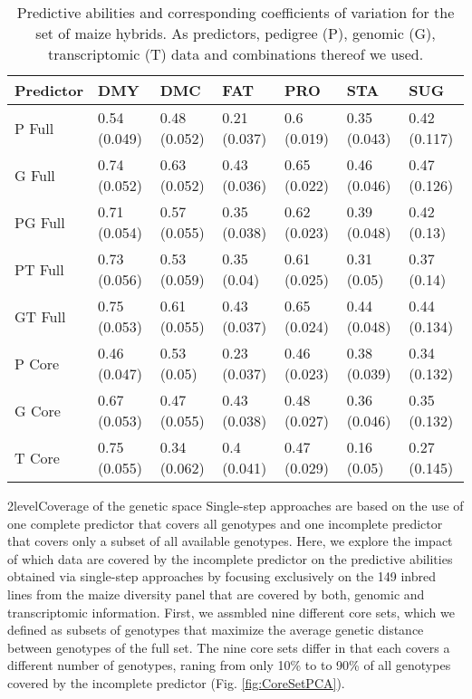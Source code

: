\documentclass[12pt,titlepage]{article}
\begin{document}
\begin{table}[ht]
\centering
\caption{Predictive abilities and corresponding coefficients of variation for the set of maize hybrids. As predictors, pedigree (P), genomic (G), transcriptomic (T) data and combinations thereof we used.} 
\label{table:HybridTable}
\begin{tabular}{lllllll}
  \toprule
Predictor & DMY & DMC & FAT & PRO & STA & SUG \\ 
  \midrule
P Full & 0.54 (0.049) & 0.48 (0.052) & 0.21 (0.037) & 0.6 (0.019) & 0.35 (0.043) & 0.42 (0.117) \\ 
  G Full & 0.74 (0.052) & 0.63 (0.052) & 0.43 (0.036) & 0.65 (0.022) & 0.46 (0.046) & 0.47 (0.126) \\ 
  PG Full & 0.71 (0.054) & 0.57 (0.055) & 0.35 (0.038) & 0.62 (0.023) & 0.39 (0.048) & 0.42 (0.13) \\ 
  PT Full & 0.73 (0.056) & 0.53 (0.059) & 0.35 (0.04) & 0.61 (0.025) & 0.31 (0.05) & 0.37 (0.14) \\ 
  GT Full & 0.75 (0.053) & 0.61 (0.055) & 0.43 (0.037) & 0.65 (0.024) & 0.44 (0.048) & 0.44 (0.134) \\ 
  P Core & 0.46 (0.047) & 0.53 (0.05) & 0.23 (0.037) & 0.46 (0.023) & 0.38 (0.039) & 0.34 (0.132) \\ 
  G Core & 0.67 (0.053) & 0.47 (0.055) & 0.43 (0.038) & 0.48 (0.027) & 0.36 (0.046) & 0.35 (0.132) \\ 
  T Core & 0.75 (0.055) & 0.34 (0.062) & 0.4 (0.041) & 0.47 (0.029) & 0.16 (0.05) & 0.27 (0.145) \\ 
   \bottomrule
\end{tabular}
\end{table}






\Genetics2level{Coverage of the genetic space}
Single-step approaches are based on the use of one complete predictor that
covers all genotypes and one incomplete predictor that covers only a subset of
all available genotypes.
Here, we explore the impact of which data are covered by the incomplete 
predictor on the predictive abilities obtained via single-step approaches by
focusing exclusively on the 149 inbred lines from the maize diversity panel
that are covered by both, genomic and transcriptomic information.
First, we assmbled nine different core sets, which we defined as subsets
of genotypes that maximize the average genetic distance between genotypes of
the full set.
The nine core sets differ in that each covers a different number of genotypes,
raning from only 10\% to to 90\% of all genotypes covered by the incomplete
predictor (Fig. \ref{fig:CoreSetPCA}).
\end{document}
